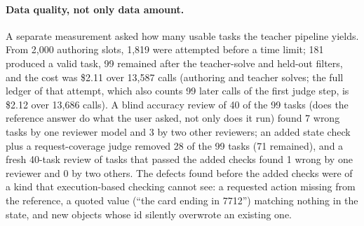 \paragraph{Data quality, not only data amount.} A separate measurement asked how many usable tasks the teacher pipeline yields. From 2{,}000 authoring slots, 1{,}819 were attempted before a time limit; 181 produced a valid task, 99 remained after the teacher-solve and held-out filters, and the cost was \$2.11 over 13{,}587 calls (authoring and teacher solves; the full ledger of that attempt, which also counts 99 later calls of the first judge step, is \$2.12 over 13{,}686 calls). A blind accuracy review of 40 of the 99 tasks (does the reference answer do what the user asked, not only does it run) found 7 wrong tasks by one reviewer model and 3 by two other reviewers; an added state check plus a request-coverage judge removed 28 of the 99 tasks (71 remained), and a fresh 40-task review of tasks that passed the added checks found 1 wrong by one reviewer and 0 by two others. %
The defects found before the added checks were of a kind that execution-based checking cannot see: a requested action missing from the reference, a quoted value (``the card ending in 7712'') matching nothing in the state, and new objects whose id silently overwrote an existing one. %

